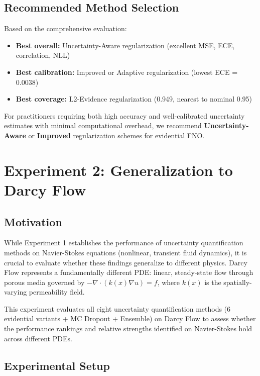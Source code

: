 \subsection{Recommended Method Selection}

Based on the comprehensive evaluation:
\begin{itemize}
\item \textbf{Best overall:} Uncertainty-Aware regularization (excellent MSE, ECE, correlation, NLL)
\item \textbf{Best calibration:} Improved or Adaptive regularization (lowest ECE = 0.0038)
\item \textbf{Best coverage:} L2-Evidence regularization (0.949, nearest to nominal 0.95)
\end{itemize}

For practitioners requiring both high accuracy and well-calibrated uncertainty estimates with minimal computational overhead, we recommend \textbf{Uncertainty-Aware} or \textbf{Improved} regularization schemes for evidential FNO.

\section{Experiment 2: Generalization to Darcy Flow}

\subsection{Motivation}

While Experiment 1 establishes the performance of uncertainty quantification methods on Navier-Stokes equations (nonlinear, transient fluid dynamics), it is crucial to evaluate whether these findings generalize to different physics. Darcy Flow represents a fundamentally different PDE: linear, steady-state flow through porous media governed by $-\nabla \cdot (k(x) \nabla u) = f$, where $k(x)$ is the spatially-varying permeability field.

This experiment evaluates all eight uncertainty quantification methods (6 evidential variants + MC Dropout + Ensemble) on Darcy Flow to assess whether the performance rankings and relative strengths identified on Navier-Stokes hold across different PDEs.

\subsection{Experimental Setup}

